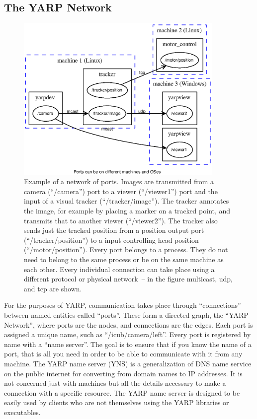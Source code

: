 \subsection{The YARP Network}


\begin{figure}[t]
\centerline{
\includegraphics[width=10cm]{fig-ports}
}
\caption{
%
\label{fig:yarp-network}
%
Example of a network of ports.
Images are transmitted from a camera (``/camera'') port to a viewer
(``/viewer1'') port and the input of a visual tracker
(``/tracker/image''). The tracker annotates the image, for example by
placing a marker on a tracked point, and transmits that to another
viewer (``/viewer2''). The tracker also sends just the tracked position
from a position output port (``/tracker/position'') to a input
controlling head position (``/motor/position''). Every port belongs to a
process. They do not need to belong to the same process or 
be on the same machine as each other.  Every individual
connection can take place using a different protocol or physical
network~-- in the figure multicast, udp, and tcp are shown.
%
}
\end{figure}

For the purposes of YARP, communication takes place through
``connections'' between named entities called ``ports''. These form a
directed graph, the ``YARP Network'', where ports are the nodes, and
connections are the edges.
%
Each port is assigned a unique name, such as
``/icub/camera/left''. Every port is registered by name with a ``name
server''. The goal is to ensure that if you know the name of a port,
that is all you need in order to be able to communicate with it from
any machine.  The YARP name server (YNS) is a generalization of DNS
name service on the public internet for converting from domain names
to IP addresses.  It is not concerned just with machines but all
the details necessary to make a connection with a specific resource.
The YARP
name server is designed to be easily used by clients who are not
themselves using the YARP libraries or executables.  

